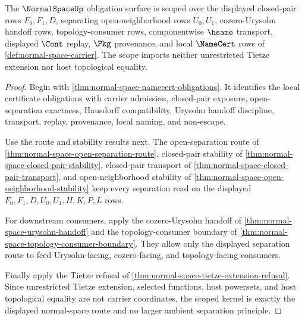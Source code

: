 \begin{theorem}
\label{thm:normal-space-scoped-kernel-grounding}
The $\NormalSpaceUp$ obligation surface is scoped over the displayed closed-pair rows $F_0,F_1,D$, separating open-neighborhood rows $U_0,U_1$, cozero-Urysohn handoff rows, topology-consumer rows, componentwise $\hsame$ transport, displayed $\Cont$ replay, $\Pkg$ provenance, and local $\NameCert$ rows of \autoref{def:normal-space-carrier}. The scope imports neither unrestricted Tietze extension nor host topological equality.
\end{theorem}
\begin{proof}
Begin with \autoref{thm:normal-space-namecert-obligations}. It identifies the local certificate obligations with carrier admission, closed-pair exposure, open-separation exactness, Hausdorff compatibility, Urysohn handoff discipline, transport, replay, provenance, local naming, and non-escape.

Use the route and stability results next. The open-separation route of \autoref{thm:normal-space-open-separation-route}, closed-pair stability of \autoref{thm:normal-space-closed-pair-stability}, closed-pair transport of \autoref{thm:normal-space-closed-pair-transport}, and open-neighborhood stability of \autoref{thm:normal-space-open-neighborhood-stability} keep every separation read on the displayed $F_0,F_1,D,U_0,U_1,H,K,P,L$ rows.

For downstream consumers, apply the cozero-Urysohn handoff of \autoref{thm:normal-space-urysohn-handoff} and the topology-consumer boundary of \autoref{thm:normal-space-topology-consumer-boundary}. They allow only the displayed separation route to feed Urysohn-facing, cozero-facing, and topology-facing consumers.

Finally apply the Tietze refusal of \autoref{thm:normal-space-tietze-extension-refusal}. Since unrestricted Tietze extension, selected functions, host powersets, and host topological equality are not carrier coordinates, the scoped kernel is exactly the displayed normal-space route and no larger ambient separation principle.
\end{proof}

